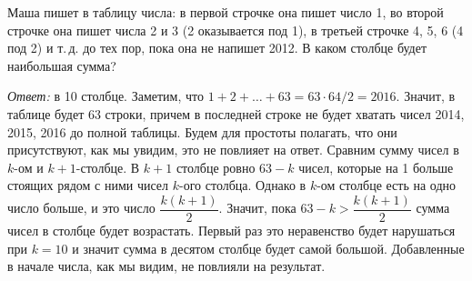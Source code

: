 Маша пишет в таблицу числа:
в первой строчке она пишет число 1, во второй строчке она пишет числа 2 и 3
(2 оказывается под 1), в третьей строчке 4, 5, 6 (4 под 2) и т.\,д. до тех
пор, пока она не напишет 2012.
В каком столбце будет наибольшая сумма?

\solution
\emph{Ответ:} в 10 столбце.
Заметим, что
$1 + 2 + \ldots + 63 = 63 \cdot 64 / 2 = 2016$.
Значит, в таблице будет 63 строки, причем в последней строке не будет хватать
чисел 2014, 2015, 2016 до полной таблицы.
Будем для простоты полагать, что они присутствуют, как мы увидим, это не
повлияет на ответ.
Сравним сумму чисел в $k$-ом и $k + 1$-столбце.
В $k + 1$ столбце ровно $63 - k$ чисел, которые на 1 больше стоящих рядом с
ними чисел $k$-ого столбца.
Однако в $k$-ом столбце есть на одно число больше, и это число
$\dfrac{k (k + 1)}{2}$.
Значит, пока $63 - k > \dfrac{k (k + 1)}{2}$ сумма чисел в столбце будет
возрастать.
Первый раз это неравенство будет нарушаться при $k = 10$ и значит сумма в
десятом столбце будет самой большой.
Добавленные в начале числа, как мы видим, не повлияли на результат.

